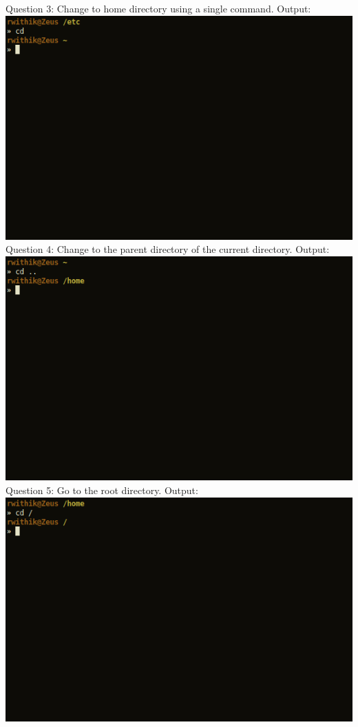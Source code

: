\documentclass[10pt,a4paper,titlepage]{report}
\begin{document}
\pagebreak
\newline
Question 3: Change to home directory using a single command.\newline
Output:\newline
\includegraphics[scale=.5]{../Images/Cycle2/3.png}\newline
\newline
Question 4: Change to the parent directory of the current directory.\newline
Output:\newline
\includegraphics[scale=.5]{../Images/Cycle2/4.png}
\pagebreak
\newline
Question 5: Go to the root directory.\newline
Output:\newline
\includegraphics[scale=.5]{../Images/Cycle2/5.png}\newline
\end{document}
